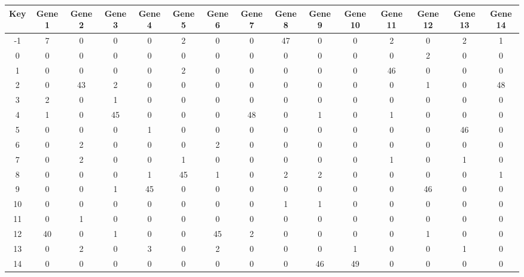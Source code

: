 \begin{tabular}{|c|c|c|c|c|c|c|c|c|c|c|c|c|c|c|}
\hline
Key & Gene 1 & Gene 2 & Gene 3 & Gene 4 & Gene 5 & Gene 6 & Gene 7 & Gene 8 & Gene 9 & Gene 10 & Gene 11 & Gene 12 & Gene 13 & Gene 14 \\
\hline
-1 & 7 & 0 & 0 & 0 & 2 & 0 & 0 & 47 & 0 & 0 & 2 & 0 & 2 & 1 \\
0 & 0 & 0 & 0 & 0 & 0 & 0 & 0 & 0 & 0 & 0 & 0 & 2 & 0 & 0 \\
1 & 0 & 0 & 0 & 0 & 2 & 0 & 0 & 0 & 0 & 0 & 46 & 0 & 0 & 0 \\
2 & 0 & 43 & 2 & 0 & 0 & 0 & 0 & 0 & 0 & 0 & 0 & 1 & 0 & 48 \\
3 & 2 & 0 & 1 & 0 & 0 & 0 & 0 & 0 & 0 & 0 & 0 & 0 & 0 & 0 \\
4 & 1 & 0 & 45 & 0 & 0 & 0 & 48 & 0 & 1 & 0 & 1 & 0 & 0 & 0 \\
5 & 0 & 0 & 0 & 1 & 0 & 0 & 0 & 0 & 0 & 0 & 0 & 0 & 46 & 0 \\
6 & 0 & 2 & 0 & 0 & 0 & 2 & 0 & 0 & 0 & 0 & 0 & 0 & 0 & 0 \\
7 & 0 & 2 & 0 & 0 & 1 & 0 & 0 & 0 & 0 & 0 & 1 & 0 & 1 & 0 \\
8 & 0 & 0 & 0 & 1 & 45 & 1 & 0 & 2 & 2 & 0 & 0 & 0 & 0 & 1 \\
9 & 0 & 0 & 1 & 45 & 0 & 0 & 0 & 0 & 0 & 0 & 0 & 46 & 0 & 0 \\
10 & 0 & 0 & 0 & 0 & 0 & 0 & 0 & 1 & 1 & 0 & 0 & 0 & 0 & 0 \\
11 & 0 & 1 & 0 & 0 & 0 & 0 & 0 & 0 & 0 & 0 & 0 & 0 & 0 & 0 \\
12 & 40 & 0 & 1 & 0 & 0 & 45 & 2 & 0 & 0 & 0 & 0 & 1 & 0 & 0 \\
13 & 0 & 2 & 0 & 3 & 0 & 2 & 0 & 0 & 0 & 1 & 0 & 0 & 1 & 0 \\
14 & 0 & 0 & 0 & 0 & 0 & 0 & 0 & 0 & 46 & 49 & 0 & 0 & 0 & 0 \\
\hline
\end{tabular}